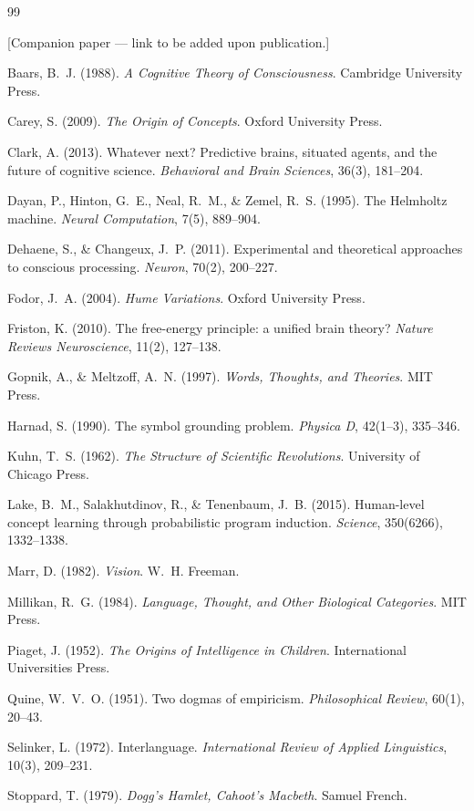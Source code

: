\documentclass[12pt, a4paper]{article}
\begin{document}
\begin{thebibliography}{99}

[Companion paper — link to be added upon publication.]

Baars, B.~J. (1988). \textit{A Cognitive Theory of Consciousness}.
Cambridge University Press.

Carey, S. (2009). \textit{The Origin of Concepts}. Oxford University
Press.

Clark, A. (2013). Whatever next? Predictive brains, situated agents,
and the future of cognitive science. \textit{Behavioral and Brain
Sciences}, 36(3), 181--204.

Dayan, P., Hinton, G.~E., Neal, R.~M., \& Zemel, R.~S. (1995). The
Helmholtz machine. \textit{Neural Computation}, 7(5), 889--904.

Dehaene, S., \& Changeux, J.~P. (2011). Experimental and theoretical
approaches to conscious processing. \textit{Neuron}, 70(2), 200--227.

Fodor, J.~A. (2004). \textit{Hume Variations}. Oxford University Press.

Friston, K. (2010). The free-energy principle: a unified brain theory?
\textit{Nature Reviews Neuroscience}, 11(2), 127--138.

Gopnik, A., \& Meltzoff, A.~N. (1997). \textit{Words, Thoughts, and
Theories}. MIT Press.

Harnad, S. (1990). The symbol grounding problem. \textit{Physica D},
42(1--3), 335--346.

Kuhn, T.~S. (1962). \textit{The Structure of Scientific Revolutions}.
University of Chicago Press.

Lake, B.~M., Salakhutdinov, R., \& Tenenbaum, J.~B. (2015). Human-level
concept learning through probabilistic program induction.
\textit{Science}, 350(6266), 1332--1338.

Marr, D. (1982). \textit{Vision}. W.~H. Freeman.

Millikan, R.~G. (1984). \textit{Language, Thought, and Other Biological
Categories}. MIT Press.

Piaget, J. (1952). \textit{The Origins of Intelligence in Children}.
International Universities Press.

Quine, W.~V.~O. (1951). Two dogmas of empiricism. \textit{Philosophical
Review}, 60(1), 20--43.

Selinker, L. (1972). Interlanguage. \textit{International Review of
Applied Linguistics}, 10(3), 209--231.

Stoppard, T. (1979). \textit{Dogg's Hamlet, Cahoot's Macbeth}. Samuel
French.


\end{thebibliography}
\end{document}

